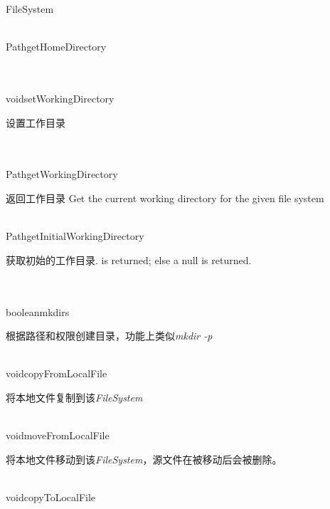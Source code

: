 \begin{XeClass}{FileSystem}
\begin{XeMethod}{\XePublic\\ }{Path}{getHomeDirectory}
  \end{XeMethod}

  \begin{XeMethod}{\XePublic\\ \XeAbstract\\ }{void}{setWorkingDirectory}
       
 设置工作目录

  \end{XeMethod}

  \begin{XeMethod}{\XePublic\\ \XeAbstract\\ }{Path}{getWorkingDirectory}
       
 返回工作目录
 Get the current working directory for the given file system

  \end{XeMethod}

  \begin{XeMethod}{\XeProtected\\ }{Path}{getInitialWorkingDirectory}
       
 获取初始的工作目录.
 is returned; else a null is returned.

  \end{XeMethod}

  \begin{XeMethod}{\XePublic\\ \XeAbstract\\ }{boolean}{mkdirs}
       
 根据路径和权限创建目录，功能上类似\emph{mkdir -p}

  \end{XeMethod}

  \begin{XeMethod}{\XePublic\\ }{void}{copyFromLocalFile}
       
 将本地文件复制到该\emph{FileSystem}

  \end{XeMethod}

  \begin{XeMethod}{\XePublic\\ }{void}{moveFromLocalFile}
       
 将本地文件移动到该\emph{FileSystem}，源文件在被移动后会被删除。

  \end{XeMethod}

  \begin{XeMethod}{\XePublic\\ }{void}{copyToLocalFile}
       

\end{XeMethod}
\end{XeClass}
